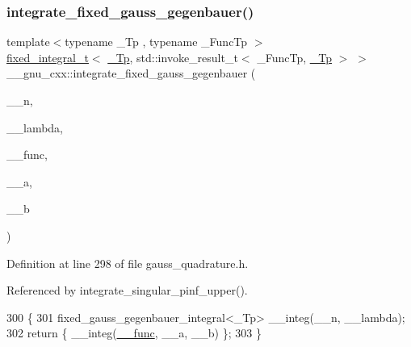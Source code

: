 \subsubsection{\texorpdfstring{integrate\+\_\+fixed\+\_\+gauss\+\_\+gegenbauer()}{integrate\_fixed\_gauss\_gegenbauer()}}
{\footnotesize\ttfamily template$<$typename \+\_\+\+Tp , typename \+\_\+\+Func\+Tp $>$ \\
\hyperlink{struct____gnu__cxx_1_1fixed__integral__t}{fixed\+\_\+integral\+\_\+t}$<$ \hyperlink{namespace____gnu__cxx_a3b19a9c800ca194374ef9172290f7d79}{\+\_\+\+Tp}, std\+::invoke\+\_\+result\+\_\+t$<$ \+\_\+\+Func\+Tp, \hyperlink{namespace____gnu__cxx_a3b19a9c800ca194374ef9172290f7d79}{\+\_\+\+Tp} $>$ $>$ \+\_\+\+\_\+gnu\+\_\+cxx\+::integrate\+\_\+fixed\+\_\+gauss\+\_\+gegenbauer (\begin{DoxyParamCaption}\item[{int}]{\+\_\+\+\_\+n,  }\item[{\hyperlink{namespace____gnu__cxx_a3b19a9c800ca194374ef9172290f7d79}{\+\_\+\+Tp}}]{\+\_\+\+\_\+lambda,  }\item[{\+\_\+\+Func\+Tp}]{\+\_\+\+\_\+func,  }\item[{\hyperlink{namespace____gnu__cxx_a3b19a9c800ca194374ef9172290f7d79}{\+\_\+\+Tp}}]{\+\_\+\+\_\+a,  }\item[{\hyperlink{namespace____gnu__cxx_a3b19a9c800ca194374ef9172290f7d79}{\+\_\+\+Tp}}]{\+\_\+\+\_\+b }\end{DoxyParamCaption})}



Definition at line 298 of file gauss\+\_\+quadrature.\+h.



Referenced by integrate\+\_\+singular\+\_\+pinf\+\_\+upper().


\begin{DoxyCode}
300     \{
301       fixed\_gauss\_gegenbauer\_integral<\_Tp> \_\_integ(\_\_n, \_\_lambda);
302       \textcolor{keywordflow}{return} \{ \_\_integ(\hyperlink{namespace____gnu__cxx_af2b2f0c7a2ae72b922b1afefae5a65b2}{\_\_func}, \_\_a, \_\_b) \};
303     \}
\end{DoxyCode}
\mbox{\label{namespace____gnu__cxx_a248024d8be18e0354ce80967dcba919a}} 
